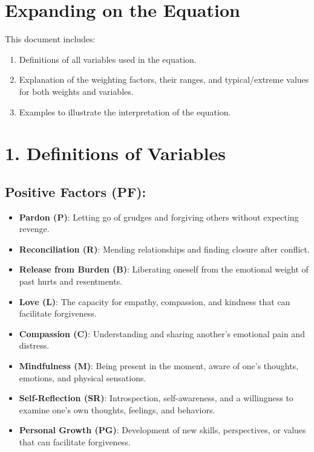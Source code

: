 \documentclass{article}
\begin{document}
\section*{Expanding on the Equation}

This document includes:

\begin{enumerate}
    \item Definitions of all variables used in the equation.
    \item Explanation of the weighting factors, their ranges, and typical/extreme values for both weights and variables.
    \item Examples to illustrate the interpretation of the equation.
\end{enumerate}

\section*{1. Definitions of Variables}

\subsection*{Positive Factors (PF):}

\begin{itemize}
    \item \textbf{Pardon (P)}: Letting go of grudges and forgiving others without expecting revenge.
    \item \textbf{Reconciliation (R)}: Mending relationships and finding closure after conflict.
    \item \textbf{Release from Burden (B)}: Liberating oneself from the emotional weight of past hurts and resentments.
    \item \textbf{Love (L)}: The capacity for empathy, compassion, and kindness that can facilitate forgiveness.
    \item \textbf{Compassion (C)}: Understanding and sharing another's emotional pain and distress.
    \item \textbf{Mindfulness (M)}: Being present in the moment, aware of one's thoughts, emotions, and physical sensations.
    \item \textbf{Self-Reflection (SR)}: Introspection, self-awareness, and a willingness to examine one's own thoughts, feelings, and behaviors.
    \item \textbf{Personal Growth (PG)}: Development of new skills, perspectives, or values that can facilitate forgiveness.
\end{itemize}
\end{document}
